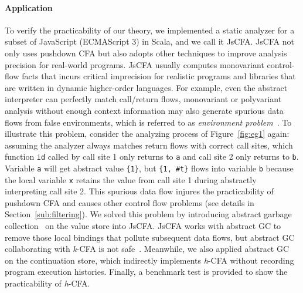 \documentclass[12pt]{report}
\begin{document}
\paragraph{Application}
To verify the practicability of our theory, we implemented a static analyzer for a subset of JavaScript (ECMAScript 3) in Scala, and we call it JsCFA\@.
JsCFA not only uses pushdown CFA but also adopts other techniques to improve analysis precision for real-world programs.
JsCFA usually computes monovariant control-flow facts that incurs critical imprecision for realistic programs and libraries that are written in dynamic higher-order languages.
For example, even the abstract interpreter can perfectly match call/return flows, monovariant or polyvariant analysis without enough context information may also generate spurious data flows from false environments, which is referred to as \emph{environment problem}~\cite{shivers1991control, might2007environment}.
To illustrate this problem, consider the analyzing process of Figure~\ref{fig:eg1} again: assuming the analyzer always matches return flows with correct call sites, which function \verb|id| called by call site 1 only returns to \verb|a| and call site 2 only returns to \verb|b|.
Variable \verb|a| will get abstract value \verb|{1}|, but \verb|{1, #t}| flows into variable \verb|b| because the local variable \verb|x| retains the value from call site 1 during abstractly interpreting call site 2.
This spurious data flow injures the practicability of pushdown CFA and causes other control flow problems (see details in Section~\ref{sub:filtering}).
We solved this problem by introducing abstract garbage collection~\cite{might2006improving} on the value store into JsCFA\@.
JsCFA works with abstract GC to remove those local bindings that pollute subsequent data flows, but abstract GC collaborating with \textit{k}-CFA is not safe~\cite{might2006improving}.
Meanwhile, we also applied abstract GC on the continuation store, which indirectly implements \textit{h}-CFA without recording program execution histories.
Finally, a benchmark test is provided to show the practicability of \textit{h}-CFA\@.
\end{document}
